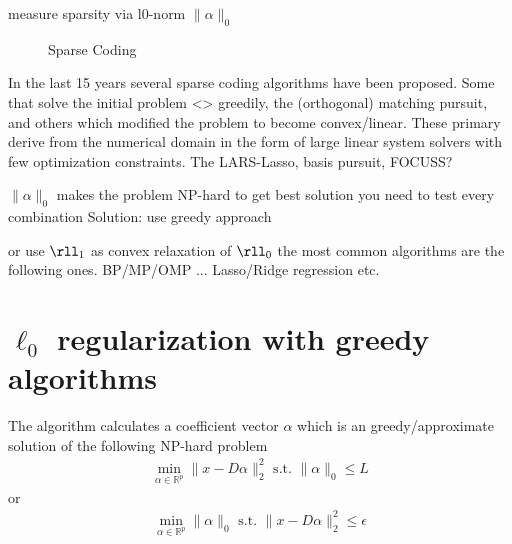 measure sparsity via       l0-norm       $\lVert\alpha\rVert_{0}$

\begin{figure}
\centering
\caption{Sparse Coding}
\label{fig:da_x}
\end{figure}


In the last 15 years several sparse coding algorithms have been proposed. 
Some that solve the initial problem <> greedily, the (orthogonal) matching pursuit, and others which modified the problem to become convex/linear. These primary derive from the numerical domain in the form of 
large linear system solvers with few optimization constraints. The LARS-Lasso, basis pursuit, FOCUSS?


$\lVert\alpha\rVert_{0}$ makes the problem NP-hard
to get best solution you need to test every combination
Solution:
use greedy approach 

or use $\rll_1$ as convex relaxation of $\rll_0$
the most common algorithms are the following ones.
BP/MP/OMP ...
Lasso/Ridge regression etc.



\section{$\ell_0$ regularization with greedy algorithms}

The algorithm calculates a coefficient vector $\alpha$ which is an greedy/approximate solution of the following NP-hard problem
\begin{align}
\min_{\alpha\in\mathbb{R}^{p}}  \lVert x - D\alpha \rVert^{2}_{2} \textrm{ s.t. } \lVert \alpha \rVert_{0} \leq L
\end{align}
or
\begin{align}
\min_{\alpha\in\mathbb{R}^{p}}   \lVert \alpha \rVert_{0}   \textrm{ s.t. } \lVert x - D\alpha \rVert^{2}_{2} \leq \epsilon
\end{align}
\cite{Mallat1993}

